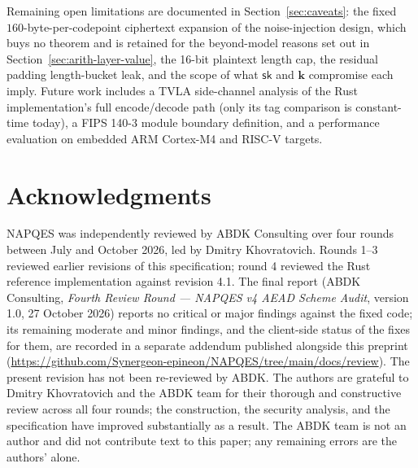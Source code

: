 \documentclass[11pt,a4paper]{article}
\begin{document}
Remaining open limitations are documented in Section~\ref{sec:caveats}:
the fixed $160$-byte-per-codepoint ciphertext expansion of the
noise-injection design, which buys no theorem and is retained for the
beyond-model reasons set out in Section~\ref{sec:arith-layer-value}, the
16-bit plaintext length cap, the residual padding length-bucket leak, and
the scope of what $\mathsf{sk}$ and $\mathbf{k}$ compromise each imply.
Future work includes a TVLA side-channel analysis of the Rust
implementation's full encode/decode path (only its tag comparison is
constant-time today), a FIPS 140-3 module boundary definition, and a
performance evaluation on embedded ARM Cortex-M4 and RISC-V targets.

\section*{Acknowledgments}
\label{sec:acknowledgments}

NAPQES was independently reviewed by ABDK Consulting over four rounds
between July and October 2026, led by Dmitry Khovratovich. Rounds 1--3
reviewed earlier revisions of this specification; round 4 reviewed the
Rust reference implementation against revision 4.1. The final report
(ABDK Consulting, \emph{Fourth Review Round --- NAPQES v4 AEAD Scheme
Audit}, version 1.0, 27 October 2026) reports no critical or major
findings against the fixed code; its remaining moderate and minor
findings, and the client-side status of the fixes for them, are recorded
in a separate addendum published alongside this preprint
(\url{https://github.com/Synergeon-epineon/NAPQES/tree/main/docs/review}).
The present revision has not been re-reviewed by ABDK.
The authors are grateful to Dmitry Khovratovich and the ABDK team for
their thorough and constructive review across all four rounds; the
construction, the security analysis, and the specification have improved
substantially as a result. The ABDK team is not an author and did not
contribute text to this paper; any remaining errors are the authors'
alone.
\end{document}
